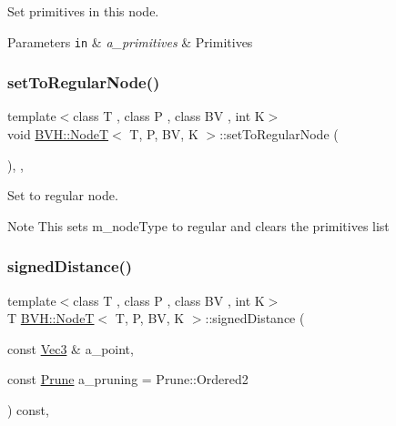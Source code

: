Set primitives in this node. 


\begin{DoxyParams}[1]{Parameters}
\mbox{\tt in}  & {\em a\+\_\+primitives} & Primitives \\
\hline
\end{DoxyParams}
\mbox{\label{classBVH_1_1NodeT_a8f9c409918d61b0d0ad3dd6e2b692443}} 
\subsubsection{\texorpdfstring{set\+To\+Regular\+Node()}{setToRegularNode()}}
{\footnotesize\ttfamily template$<$class T , class P , class BV , int K$>$ \\
void \hyperlink{classBVH_1_1NodeT}{B\+V\+H\+::\+NodeT}$<$ T, P, BV, K $>$\+::set\+To\+Regular\+Node (\begin{DoxyParamCaption}{ }\end{DoxyParamCaption})\hspace{0.3cm}{\ttfamily [inline]}, {\ttfamily [protected]}, {\ttfamily [noexcept]}}



Set to regular node. 

\begin{DoxyNote}{Note}
This sets m\+\_\+node\+Type to regular and clears the primitives list 
\end{DoxyNote}
\mbox{\label{classBVH_1_1NodeT_aef7148b18296dce60853b5966c9f1e0d}} 
\subsubsection{\texorpdfstring{signed\+Distance()}{signedDistance()}}
{\footnotesize\ttfamily template$<$class T , class P , class BV , int K$>$ \\
T \hyperlink{classBVH_1_1NodeT}{B\+V\+H\+::\+NodeT}$<$ T, P, BV, K $>$\+::signed\+Distance (\begin{DoxyParamCaption}\item[{const \hyperlink{classBVH_1_1NodeT_a6fbb4308c5c55ee170c5f992df7ae1d0}{Vec3} \&}]{a\+\_\+point,  }\item[{const \hyperlink{namespaceBVH_a3ddb7b34ac1deb3baed2f32d9eacbe5b}{Prune}}]{a\+\_\+pruning = {\ttfamily Prune\+:\+:Ordered2} }\end{DoxyParamCaption}) const\hspace{0.3cm}{\ttfamily [inline]}, {\ttfamily [noexcept]}}



